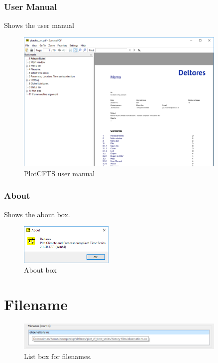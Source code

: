 \documentclass{deltares_memo}
\begin{document}
\subsubsection{User Manual}
Shows the user manual
\begin{figure}[H]
	\centering    
	\includegraphics[width=0.9\textwidth]{pictures/menu_help_user_manual.png}
	\caption{PlotCFTS user manual}
\end{figure}
\subsubsection{About}
Shows the about box.
\begin{figure}[H]
    \centering    
    \includegraphics[width=0.4\textwidth]{pictures/menu_help_about.png}
    \caption{About box}
\end{figure}
\section{Filename}
\begin{figure}[H]
    \centering    
    \includegraphics[width=0.9\textwidth]{pictures/group_filenames.png}
    \caption{List box for filenames.}
\end{figure}%
\end{document}
